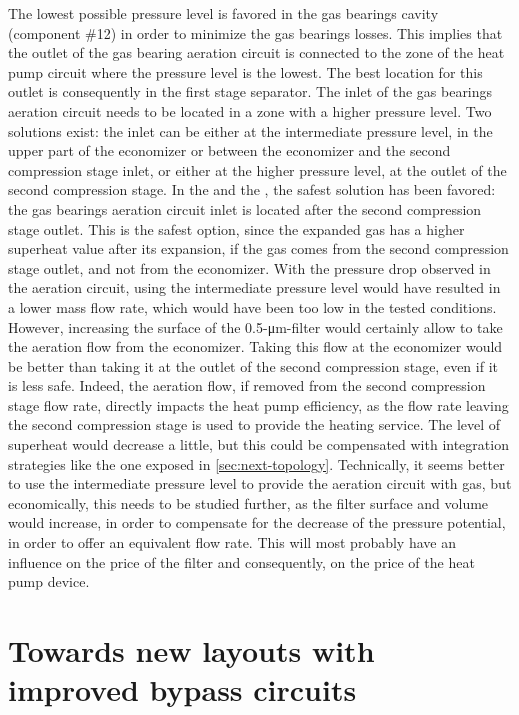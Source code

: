 The lowest possible pressure level is favored in the gas bearings
cavity (component \#12) in order to minimize the gas bearings
losses. This implies that the outlet of the gas bearing aeration
circuit is connected to the zone of the heat pump circuit where the
pressure level is the lowest. The best location for this outlet is
consequently in the first stage separator. The inlet of the gas
bearings aeration circuit needs to be located in a zone with a higher
pressure level. Two solutions exist: the inlet can be either at the
intermediate pressure level, in the upper part of the economizer or
between the economizer and the second compression stage inlet, or
either at the higher pressure level, at the outlet of the second
compression stage. In the \BWP{} and the \AWP{}, the safest solution
has been favored: the gas bearings aeration circuit inlet is located
after the second compression stage outlet. This is the safest option,
since the expanded gas has a higher superheat value after its
expansion, if the gas comes from the second compression stage outlet,
and not from the economizer. With the pressure drop observed in the
\AWP{} aeration circuit, using the intermediate pressure level would
have resulted in a lower mass flow rate, which would have been too low
in the tested conditions. However, increasing the surface of the
0.5-\si{\micro\meter}-filter would certainly allow to take the
aeration flow from the economizer. Taking this flow at the economizer
would be better than taking it at the outlet of the second compression
stage, even if it is less safe. Indeed, the aeration flow, if removed
from the second compression stage flow rate, directly impacts the heat
pump efficiency, as the flow rate leaving the second compression stage
is used to provide the heating service. The level of superheat would
decrease a little, but this could be compensated with integration
strategies like the one exposed in
\cref{sec:next-topology}. Technically, it seems better to use the
intermediate pressure level to provide the aeration circuit with gas,
but economically, this needs to be studied further, as the filter
surface and volume would increase, in order to compensate for the
decrease of the pressure potential, in order to offer an equivalent
flow rate. This will most probably have an influence on the price of
the filter and consequently, on the price of the heat pump device.

\section{Towards new layouts with improved
  bypass circuits}
\label{sec:cp-intg-new-bypass}

